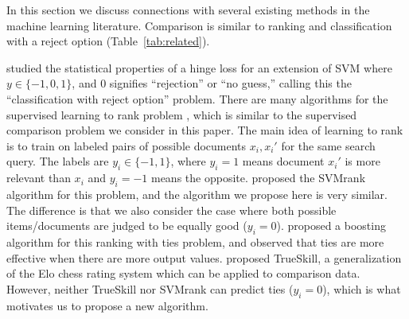 \documentclass{article}
\newcommand{\RR}{\mathbb R}
\begin{document}
In this section we discuss connections with several existing methods
in the machine learning literature. Comparison is similar to ranking
and classification with a reject option (Table~\ref{tab:related}).

\citet{reject-option} studied the statistical properties of a hinge
loss for an extension of SVM where $y\in\{-1,0,1\}$, and
0 signifies ``rejection'' or ``no guess,'' calling this the
``classification with reject option'' problem.
There are many algorithms for the supervised learning to rank problem
\citep{learning-to-rank}, which is similar to the supervised
comparison problem we consider in this paper. The main idea of
learning to rank is to train on labeled pairs of possible documents
$x_i,x_i'$ for the same search query. The labels are $y_i\in\{-1,1\}$,
where $y_i=1$ means document $x_i'$ is more relevant than $x_i$ and
$y_i=-1$ means the opposite. \citet{ranksvm} proposed the SVMrank
algorithm for this problem, and the algorithm we propose here is very
similar. The difference is that we also consider the case where both
possible items/documents are judged to be equally good ($y_i=0$).
\citet{rank-with-ties} proposed a boosting algorithm for this ranking
with ties problem, and observed that ties are more effective when
there are more output values.
\citet{trueskill} proposed TrueSkill, a generalization of the Elo
chess rating system which can be applied to comparison data. However,
neither TrueSkill nor SVMrank can predict ties ($y_i=0$), which is
what motivates us to propose a new algorithm.

%   

\end{document}
